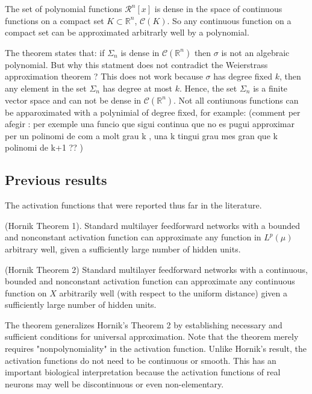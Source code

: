 \documentclass[../main.tex]{subfiles}
\begin{document}
\begin{corolari}
	The set of polynomial functions $\mathcal{R}^n[x]$ is dense in the space of continuous functions on a compact set $K \subset \mathbb{R}^n$, $\mathcal{C}(K)$. So any continuous function on a compact set can be approximated arbitrarly well by a polynomial. 
\end{corolari}

\noindent The theorem states that: if $\Sigma_n$ is dense in $\mathcal{C}(\mathbb{R}^n)$ then $\sigma$ is not an algebraic polynomial. But why this statment does not contradict the Weierstrass approximation theorem ?
This does not work because $\sigma$ has degree fixed $k$, then any element in the set $\Sigma_n$ has degree at most $k$. Hence, the set $\Sigma_n$ is a finite vector space and can not be dense in $\mathcal{C}(\mathbb{R}^n)$. Not all contiunous functions can be apparoximated with a polynimial of degree fixed, for example: 
(comment per afegir : per exemple una funcio que sigui continua que no es pugui approximar per un polinomi de com a molt grau k , una k tingui grau mes gran que k polinomi de k+1 ?? )

\subsection{Previous results}
 The activation functions that were reported thus far in the literature. 
\begin{theorem} (Hornik Theorem 1). Standard multilayer feedforward networks with a bounded and nonconstant activation function can approximate any function in $L^p(\mu)$ arbitrary well, given a sufficiently large number of hidden units. 
\end{theorem}

\begin{theorem} (Hornik Theorem 2)  Standard multilayer feedforward networks with a continuous, bounded and nonconstant activation function can approximate any continuous function on $X$ arbitrarily well (with respect to the uniform distance) given a sufficiently large number of hidden units. 
\end{theorem}

\noindent
The theorem generalizes Hornik's Theorem 2 by establishing necessary and sufficient conditions for universal approximation. Note that the theorem merely requires "nonpolynomiality" in the activation function. Unlike Hornik's result, the activation functions do not need to be continuous or smooth. This has an important biological interpretation because the activation functions of real neurons may well be discontinuous or even non-elementary.
\end{document}
